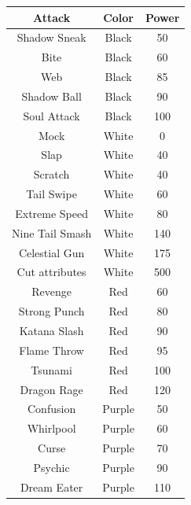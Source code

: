 \documentclass[a4paper,12pt]{report}
\begin{document}
\begin{tabular}{ |c|c|c| } 
     \hline
     \textbf{Attack} & \textbf{Color} & \textbf{Power} \\ 
     \hline
     \hline
     Shadow Sneak & Black & 50 \\ 
     \hline
     Bite & Black & 60 \\ 
     \hline
     Web & Black & 85 \\ 
     \hline
     Shadow Ball & Black & 90 \\ 
     \hline
     Soul Attack & Black & 100 \\ 
     \hline
     Mock & White & 0 \\ 
     \hline
     Slap & White & 40 \\ 
     \hline
     Scratch & White & 40 \\ 
     \hline
     Tail Swipe & White & 60 \\ 
     \hline
     Extreme Speed & White & 80 \\ 
     \hline
     Nine Tail Smash & White & 140 \\ 
     \hline
     Celestial Gun & White & 175 \\ 
     \hline
     Cut attributes & White & 500 \\ 
     \hline
     Revenge & Red & 60 \\ 
     \hline
     Strong Punch & Red & 80 \\ 
     \hline
     Katana Slash & Red & 90 \\ 
     \hline
     Flame Throw & Red & 95 \\ 
     \hline
     Tsunami & Red & 100 \\ 
     \hline
     Dragon Rage & Red & 120 \\ 
     \hline
     Confusion & Purple & 50 \\ 
     \hline
     Whirlpool & Purple & 60 \\ 
     \hline
     Curse & Purple & 70 \\ 
     \hline
     Psychic & Purple & 90 \\ 
     \hline
     Dream Eater & Purple & 110 \\ 
     \hline
\end{tabular}
\end{document}

